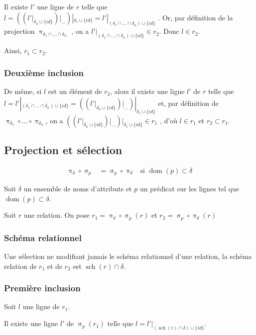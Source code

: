 \documentclass[french]{article}
\DeclareMathOperator{\proj}{\pi}
\DeclareMathOperator{\sel}{\sigma}
\DeclareMathOperator{\dom}{dom}
\DeclareMathOperator{\s}{sch}
\newcommand{\projDelta}{\proj_{\delta}}
\newcommand{\selP}{\sel_p}
\newcommand{\cip}{\cup \{id\}}
\newcommand{\intro}[2]{Soit $r$ une relation. On pose $r_1 = #1(r) $ et $r_2 = #2(r) $}
\begin{document}
Il existe $l'$ une ligne de $r$ telle que
$
l = {\left( 
	 {\left(    
	  l'|_{\delta_n \cip} 
	 \right)} |_{\dots }
	\right)} |_{\delta_1 \cip}
= l'|_{(\delta_1 \cap \dots \cap \delta_n) \cip}
$
.
Or, par définition de la projection $\proj_{\delta_1 \cap \dots \cap \delta_n}$ ,
on a $l' |_{(\delta_1 \cap \dots \cap \delta_n) \cip} \in r_2$.
Donc $l \in r_2$.

Ainsi, $r_1 \subset r_2$.

\subsubsection*{Deuxième inclusion}
De même, si $l$ est un élément de $r_2$,
alors il existe une ligne $l'$ de $r$ telle que
$l = l' |_{(\delta_1 \cap \dots \cap \delta_n) \cip} = 
 {\left( 
	{\left(    
		l'|_{\delta_n \cip} 
		\right)} |_{\dots }
	\right)} |_{\delta_1 \cip}
$
et, par définition de 
$\proj_{\delta_1}\circ \dots \circ \proj_{\delta_n}$, on a
$
{\left( 
	{\left(    
		l'|_{\delta_n \cip} 
		\right)} |_{\dots }
	\right)} |_{\delta_1 \cip}
\in r_1
$ 
, d'où $l \in r_1$ et $r_2 \subset r_1$.

\subsection*{Projection et sélection}
\begin{align}
\projDelta \circ \selP
& = \selP \circ \projDelta
& \text{si $\dom(p) \subset \delta$}
\end{align}

Soit $\delta$ un ensemble de noms d'attributs
et $p$ un prédicat sur les lignes tel que
$\dom(p) \subset \delta$.

\intro{\projDelta \circ \selP}{\selP \circ \projDelta}

\subsubsection*{Schéma relationnel}
Une sélection ne modifiant jamais le schéma relationnel
d'une relation,
la schéma relation de $r_1$ et de $r_2$ est
$\s(r) \cap \delta$.

\subsubsection*{Première inclusion}
Soit $l$ une ligne de $r_1$.

Il existe une ligne $l'$ de $\selP(r_1)$
telle que $l = l'|_{(\s(r)\cap \delta) \cip}$.
\end{document}
